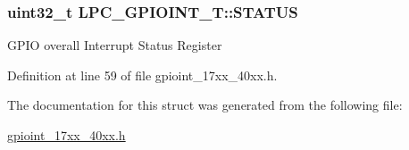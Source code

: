 \subsubsection[{\texorpdfstring{S\+T\+A\+T\+US}{STATUS}}]{ uint32\+\_\+t L\+P\+C\+\_\+\+G\+P\+I\+O\+I\+N\+T\+\_\+\+T\+::\+S\+T\+A\+T\+US}\hypertarget{structLPC__GPIOINT__T_a9547c1d447b762a819920fe2a10c5029}{}\label{structLPC__GPIOINT__T_a9547c1d447b762a819920fe2a10c5029}
G\+P\+IO overall Interrupt Status Register 

Definition at line 59 of file gpioint\+\_\+17xx\+\_\+40xx.\+h.



The documentation for this struct was generated from the following file\+:\begin{DoxyCompactItemize}
\item 
\hyperlink{gpioint__17xx__40xx_8h}{gpioint\+\_\+17xx\+\_\+40xx.\+h}\end{DoxyCompactItemize}
